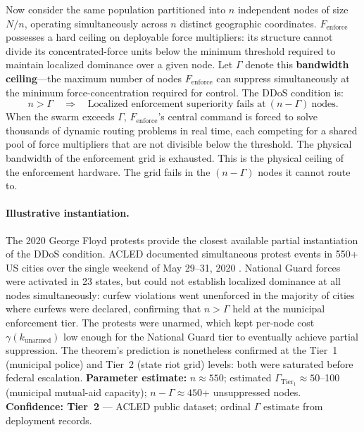 Now consider the same population partitioned into $n$ independent nodes of size $N/n$, operating simultaneously across $n$ distinct geographic coordinates. $F_{\text{enforce}}$ possesses a hard ceiling on deployable force multipliers: its structure cannot divide its concentrated-force units below the minimum threshold required to maintain localized dominance over a given node. Let $\Gamma$ denote this \textbf{bandwidth ceiling}---the maximum number of nodes $F_{\text{enforce}}$ can suppress simultaneously at the minimum force-concentration required for control. The DDoS condition is:
\begin{equation}\label{eq:14.7-ddos-bandwidth-ceiling}
n > \Gamma \quad \Longrightarrow \quad \text{Localized enforcement superiority fails at} \ (n - \Gamma) \ \text{nodes.}
\end{equation}
When the swarm exceeds $\Gamma$, $F_{\text{enforce}}$'s central command is forced to solve thousands of dynamic routing problems in real time, each competing for a shared pool of force multipliers that are not divisible below the threshold. The physical bandwidth of the enforcement grid is exhausted. This is the physical ceiling of the enforcement hardware. The grid fails in the $(n - \Gamma)$ nodes it cannot route to.

\paragraph{Illustrative instantiation.}
The 2020 George Floyd protests provide the closest available partial instantiation of the DDoS condition. ACLED documented simultaneous protest events in 550+ US cities over the single weekend of May 29--31, 2020 \cite{acled_us_2020}. National Guard forces were activated in 23 states, but could not establish localized dominance at all nodes simultaneously: curfew violations went unenforced in the majority of cities where curfews were declared, confirming that $n > \Gamma$ held at the municipal enforcement tier. The protests were unarmed, which kept per-node cost $\gamma(k_{\text{unarmed}})$ low enough for the National Guard tier to eventually achieve partial suppression. The theorem's prediction is nonetheless confirmed at the Tier~1 (municipal police) and Tier~2 (state riot grid) levels: both were saturated before federal escalation. \textbf{Parameter estimate:} $n \approx 550$; estimated $\Gamma_{\text{Tier}_1} \approx 50$--100 (municipal mutual-aid capacity); $n - \Gamma \approx 450$+ unsuppressed nodes. \textbf{Confidence: Tier~2} --- ACLED public dataset; ordinal $\Gamma$ estimate from deployment records.

